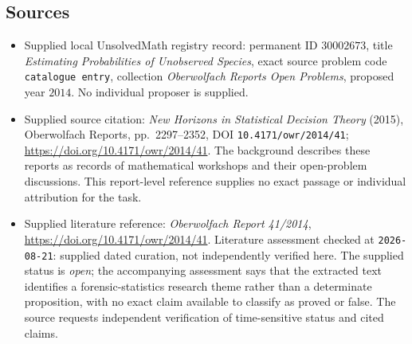 \documentclass[11pt]{article}
\begin{document}
\subsection{Sources}
\begin{itemize}
\item Supplied local UnsolvedMath registry record: permanent ID \(30002673\), title \emph{Estimating Probabilities of Unobserved Species}, exact source problem code \texttt{catalogue entry}, collection \emph{Oberwolfach Reports Open Problems}, proposed year \(2014\). No individual proposer is supplied.
\item Supplied source citation: \emph{New Horizons in Statistical Decision Theory} (2015), Oberwolfach Reports, pp.\ 2297--2352, DOI \texttt{10.4171/owr/2014/41}; \url{https://doi.org/10.4171/owr/2014/41}. The background describes these reports as records of mathematical workshops and their open-problem discussions. This report-level reference supplies no exact passage or individual attribution for the task.
\item Supplied literature reference: \emph{Oberwolfach Report 41/2014}, \url{https://doi.org/10.4171/owr/2014/41}. Literature assessment checked at \texttt{2026-08-21}: supplied dated curation, not independently verified here. The supplied status is \emph{open}; the accompanying assessment says that the extracted text identifies a forensic-statistics research theme rather than a determinate proposition, with no exact claim available to classify as proved or false. The source requests independent verification of time-sensitive status and cited claims.
\end{itemize}
\end{document}
